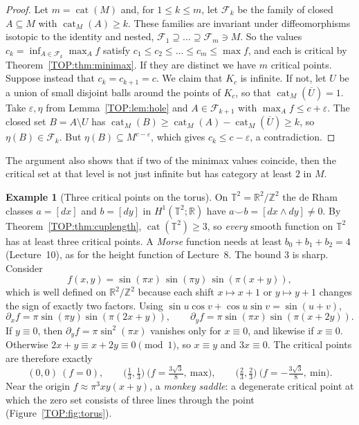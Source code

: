 \documentclass[11pt,openany]{book}
\theoremstyle{plain}
\theoremstyle{definition}
\newtheorem{example}[theorem]{Example}
\theoremstyle{remark}
\newcommand{\R}{\mathbb{R}}
\newcommand{\Z}{\mathbb{Z}}
\newcommand{\T}{\mathbb{T}}
\begin{document}
\begin{proof}
Let $m=\operatorname{cat}(M)$ and, for $1\le k\le m$, let $\mathcal F_k$ be the family of closed
$A\subseteq M$ with $\operatorname{cat}_M(A)\ge k$. These families are invariant under diffeomorphisms
isotopic to the identity and nested, $\mathcal F_1\supseteq\dots\supseteq\mathcal F_m\ni M$. So the values
$c_k=\inf_{A\in\mathcal F_k}\max_Af$ satisfy $c_1\le c_2\le\dots\le c_m\le\max f$, and each is critical by
Theorem~\ref{TOP:thm:minimax}. If they are distinct we have $m$ critical points. Suppose instead that
$c_k=c_{k+1}=c$. We claim that $K_c$ is infinite. If not, let $U$ be a union of small disjoint balls around
the points of $K_c$, so that $\operatorname{cat}_M(\overline U)=1$. Take $\varepsilon,\eta$ from
Lemma~\ref{TOP:lem:hole} and $A\in\mathcal F_{k+1}$ with $\max_Af\le c+\varepsilon$. The closed set $B=A\setminus
U$ has $\operatorname{cat}_M(B)\ge\operatorname{cat}_M(A)-\operatorname{cat}_M(\overline U)\ge k$, so
$\eta(B)\in\mathcal F_k$. But $\eta(B)\subseteq M^{c-\varepsilon}$, which gives $c_k\le c-\varepsilon$, a
contradiction.
\end{proof}

The argument also shows that if two of the minimax values coincide, then the critical set at that level
is not just infinite but has category at least $2$ in $M$.

\begin{example}[Three critical points on the torus]\label{TOP:ex:torus}
On $\T^2=\R^2/\Z^2$ the de Rham classes $a=[dx]$ and $b=[dy]$ in $H^1(\T^2;\R)$ have
$a\smile b=[dx\wedge dy]\neq0$. By Theorem~\ref{TOP:thm:cuplength}, $\operatorname{cat}(\T^2)\ge3$, so \emph{every}
smooth function on $\T^2$ has at least three critical points. A \emph{Morse} function needs at least
$b_0+b_1+b_2=4$ (Lecture~10), as for the height function of Lecture~8. The bound $3$ is sharp. Consider
\[
  f(x,y)=\sin(\pi x)\,\sin(\pi y)\,\sin(\pi(x+y)),
\]
which is well defined on $\R^2/\Z^2$ because each shift $x\mapsto x+1$ or $y\mapsto y+1$ changes the
sign of exactly two factors. Using $\sin u\cos v+\cos u\sin v=\sin(u+v)$,
\[
  \partial_xf=\pi\sin(\pi y)\sin(\pi(2x+y)),\qquad \partial_yf=\pi\sin(\pi x)\sin(\pi(x+2y)).
\]
If $y\equiv0$, then $\partial_yf=\pi\sin^2(\pi x)$ vanishes only for $x\equiv0$, and likewise if $x\equiv0$.
Otherwise $2x+y\equiv x+2y\equiv0\pmod1$, so $x\equiv y$ and $3x\equiv0$. The critical points are therefore
exactly
\[
  (0,0)\ (f=0),\qquad \big(\tfrac13,\tfrac13\big)\ \big(f=\tfrac{3\sqrt3}8,\ \text{max}\big),\qquad
  \big(\tfrac23,\tfrac23\big)\ \big(f=-\tfrac{3\sqrt3}8,\ \text{min}\big).
\]
Near the origin $f\approx\pi^3xy(x+y)$, a \emph{monkey saddle}: a degenerate critical point at which the
zero set consists of three lines through the point (Figure~\ref{TOP:fig:torus}).
\end{example}
\end{document}
